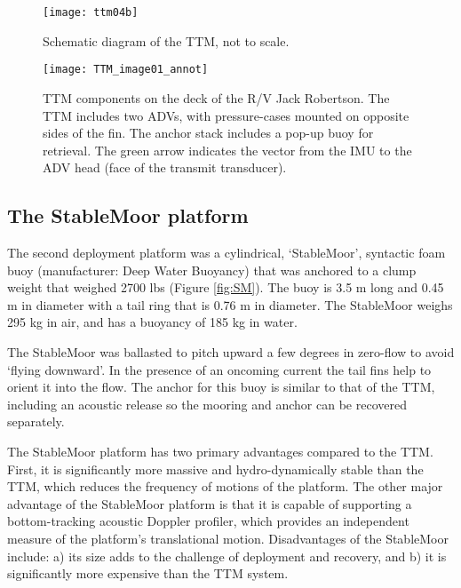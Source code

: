 \begin{figure}[t]
  \centering
  \texttt{[image: ttm04b]}
  \caption{Schematic diagram of the TTM, not to scale.}
  \label{fig:ttm:diagram}
\end{figure}

\begin{figure}[t]
  \centering
  \texttt{[image: TTM\_image01\_annot]}
  \caption{TTM components on the deck of the R/V Jack Robertson. The TTM includes two ADVs, with pressure-cases mounted on opposite sides of the fin. The anchor stack includes a pop-up buoy for retrieval. The green arrow indicates the vector from the IMU to the ADV head (face of the transmit transducer). }
  \label{fig:ttm:photo}
\end{figure}

\subsection{The StableMoor platform}

The second deployment platform was a cylindrical, `StableMoor', syntactic foam buoy (manufacturer: Deep Water Buoyancy) that was anchored to a clump weight that weighed 2700 lbs (Figure \ref{fig:SM}). The buoy is 3.5 m long and 0.45 m in diameter with a tail ring that is 0.76 m in diameter. The StableMoor weighs 295 kg in air, and has a buoyancy of 185 kg in water. 

The StableMoor was ballasted to pitch upward a few degrees in zero-flow to avoid `flying downward'. In the presence of an oncoming current the tail fins help to orient it into the flow. The anchor for this buoy is similar to that of the TTM, including an acoustic release so the mooring and anchor can be recovered separately.

The StableMoor platform has two primary advantages compared to the TTM. First, it is significantly more massive and hydro-dynamically stable than the TTM, which reduces the frequency of motions of the platform. The other major advantage of the StableMoor platform is that it is capable of supporting a bottom-tracking acoustic Doppler profiler, which provides an independent measure of the platform's translational motion. Disadvantages of the StableMoor include: a) its size adds to the challenge of deployment and recovery, and b) it is significantly more expensive than the TTM system.

